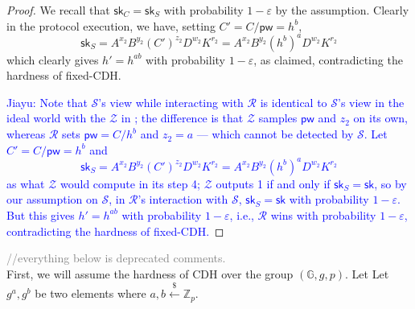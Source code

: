 \documentclass[12pt,a4paper]{article}
\newcommand{\simulator}{\mathcal{S}}
\newcommand{\env}{\mathcal{Z}}
\newcommand{\sk}{\mathsf{sk}}
\newcommand{\pw}{\mathsf{pw}}
\def\xjy#1{\textcolor{blue}{Jiayu: #1}}
\begin{document}
\begin{proof}
		We recall that $\sk_C=\sk_S$ with probability $1-\varepsilon$ by the assumption. Clearly in the protocol execution, we have, setting $C'=C/\pw=h^b$,
		$$\sk_S = A^{x_2}B^{y_2}(C')^{z_2}D^{w_2}K^{r_2}=A^{x_2}B^{y_2}(h^b)^{a}D^{w_2}K^{r_2}$$ which clearly gives $h' = h^{ab}$ with probability $1-\varepsilon$, as claimed, contradicting the hardness of fixed-CDH.

\xjy{Note that $\simulator$'s view while interacting with $\mathcal{R}$ is identical to $\simulator$'s view in the ideal world with the $\env$ in \Cref{fig:adv}; the difference is that $\env$ samples $\pw$ and $z_2$ on its own, whereas $\mathcal{R}$ sets $\pw = C/h^b$ and $z_2 = a$ --- which cannot be detected by $\simulator$. Let $C' = C/\pw = h^b$ and
$$\sk_S = A^{x_2}B^{y_2}(C')^{z_2}D^{w_2}K^{r_2}=A^{x_2}B^{y_2}(h^b)^{a}D^{w_2}K^{r_2}$$
as what $\env$ would compute in its step 4; $\env$ outputs 1 if and only if $\sk_S = \sk$, so by our assumption on $\simulator$, in $\mathcal{R}$'s interaction with $\simulator$, $\sk_S = \sk$ with probability $1-\varepsilon$. But this gives $h' = h^{ab}$ with probability $1-\varepsilon$, i.e., $\mathcal{R}$ wins with probability $1-\varepsilon$, contradicting the hardness of fixed-CDH.}
		\end{proof}
	
	
	\textcolor{gray}{//everything below is deprecated comments.}\\

	
	First, we will assume the hardness of CDH over the group $(\mathbb{G},g,p)$. Let Let $g^a,g^b$ be two elements where $a,b\xleftarrow{\$}\mathbb{Z}_p$. 
	
\end{document}
